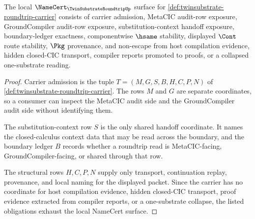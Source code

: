 \begin{theorem}
\label{thm:twinsubstrate-roundtrip-namecert-obligations}
The local $\NameCert_{\TwinSubstrateRoundtripUp}$ surface for \autoref{def:twinsubstrate-roundtrip-carrier} consists of carrier admission, MetaCIC audit-row exposure, GroundCompiler audit-row exposure, substitution-context handoff exposure, boundary-ledger exactness, componentwise $\hsame$ stability, displayed $\Cont$ route stability, $\Pkg$ provenance, and non-escape from host compilation evidence, hidden closed-CIC transport, compiler reports promoted to proofs, or a collapsed one-substrate reading.
\end{theorem}
\begin{proof}
Carrier admission is the tuple $T=(M,G,S,B,H,C,P,N)$ of \autoref{def:twinsubstrate-roundtrip-carrier}. The rows $M$ and $G$ are separate coordinates, so a consumer can inspect the MetaCIC audit side and the GroundCompiler audit side without identifying them.

The substitution-context row $S$ is the only shared handoff coordinate. It names the closed-calculus context data that may be read across the boundary, and the boundary ledger $B$ records whether a roundtrip read is MetaCIC-facing, GroundCompiler-facing, or shared through that row.

The structural rows $H,C,P,N$ supply only transport, continuation replay, provenance, and local naming for the displayed packet. Since the carrier has no coordinate for host compilation evidence, hidden closed-CIC transport, proof evidence extracted from compiler reports, or a one-substrate collapse, the listed obligations exhaust the local NameCert surface.
\end{proof}

